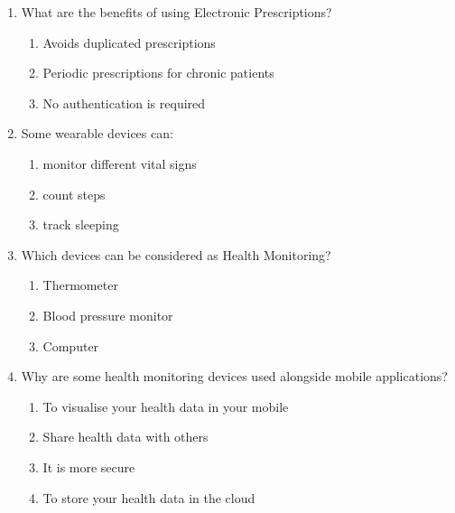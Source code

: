 \documentclass[10pt, twoside]{article}   	%
\begin{document}
\begin{enumerate}
       \item What are the benefits of using Electronic Prescriptions?
          \begin{enumerate}  
              \item Avoids duplicated prescriptions
              \item Periodic prescriptions for chronic patients
              \item No authentication is required
           \end {enumerate}       
       \item Some wearable devices can:
          \begin{enumerate}  
              \item monitor different vital signs
              \item count steps
              \item track sleeping
           \end {enumerate}       
       \item Which devices can be considered as Health Monitoring?
          \begin{enumerate}  
              \item Thermometer
              \item Blood pressure monitor
              \item Computer
           \end {enumerate}       
       \item Why are some health monitoring devices used alongside mobile applications?
          \begin{enumerate}  
              \item To visualise your health data in your mobile
              \item Share health data with others
              \item It is more secure
              \item To store your health data in the cloud
           \end {enumerate}       




        \end {enumerate} 
  
\end{document}
